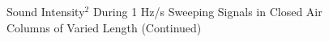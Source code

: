 \begin{figure}
	\hspace{40pt}
	\caption{Sound Intensity$^2$ During 1 Hz/s Sweeping Signals in Closed Air Columns of Varied Length (Continued)\label{fig:test}}
\end{figure}
\clearpage
\newpage

